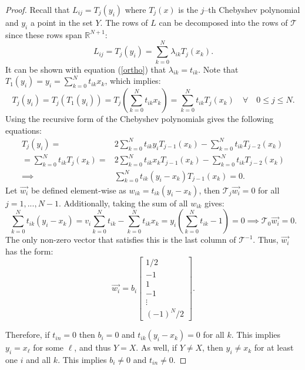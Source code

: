 \documentclass{sfuthesis}
\begin{document}
\begin{proof}
Recall that $L_{ij} = T_j(y_i)$ where $T_j(x)$ is the $j$--th Chebyshev polynomial and $y_i$ a point in the set $Y$.
The rows of $L$ can be decomposed into the rows of $\mathcal{T}$ since these rows span $\mathbb{R}^{N+1}$:
\begin{equation}
L_{ij} =T_j(y_i) = \sum_{k=0}^N \lambda_{ik} T_j(x_k) .
\end{equation}
It can be shown with equation (\ref{ortho}) that $\lambda_{ik} = t_{ik}$.
Note that $T_1(y_i) = y_i = \sum_{k=0}^N t_{ik} x_k$, which implies:
\begin{equation}
T_j(y_i) = T_j( T_1(y_i)) = T_j \left ( \sum_{k=0}^N t_{ik} x_k \right ) = \sum_{k=0}^N t_{ik} T_j(x_k) \quad \forall \quad 0 \leq j \leq N .
\end{equation}
Using the recursive form of the Chebyshev polynomials gives the following equations:
\begin{equation}
\begin{aligned}
T_j(y_i) = & 2 \sum_{k=0}^N t_{ik} y_i T_{j-1}(x_k) - \sum_{k=0}^N t_{ik} T_{j-2}(x_k) \\
= \sum_{k=0}^N t_{ik} T_j (x_k) = & 2 \sum_{k=0}^N t_{ik} x_k T_{j-1}(x_k) - \sum_{k=0}^N t_{ik} T_{j-2}(x_k) \\
 \implies & \sum_{k=0}^N t_{ik} (y_i - x_k) T_{j-1}(x_k) = 0 .
\end{aligned}
\end{equation}
Let $\vec{w_i}$ be defined element-wise as $w_{ik} = t_{ik} (y_i - x_k)$, then $\mathcal{T}_j  \vec{w_i} = 0$ for all $j = 1, ... , N-1$.
Additionally, taking the sum of all $w_{ik}$ gives:
\begin{equation}
\sum_{k=0}^N t_{ik} (y_i - x_k) = v_i \sum_{k=0}^N t_{ik} - \sum_{k=0}^N t_{ik} x_k = y_i \left (\sum_{k=0}^N t_{ik} - 1 \right ) = 0 \implies \mathcal{T}_0  \vec{w_i} = 0 .
\end{equation}
The only non-zero vector that satisfies this is the last column of $\mathcal{T}^{-1}$.
Thus, $\vec{w_i}$ has the form:
\begin{equation}
\vec{w_i} = b_i
\begin{bmatrix}
1/2 \\ -1 \\ 1 \\ -1 \\ \vdots \\ (-1)^N/2
\end{bmatrix}.
\end{equation}

Therefore, if $t_{in} = 0$ then $b_i = 0$ and $t_{ik} (y_i - x_k) = 0$ for all $k$.
This implies $y_i = x_{\ell}$ for some $\ell$, and thus $Y = X$.
As well, if $Y \neq X$, then $y_i \neq x_k$ for at least one $i$ and all $k$.
This implies $b_i \neq 0$ and $t_{in} \neq 0$.


\end{proof}
\end{document}
